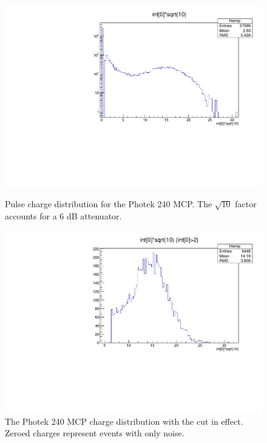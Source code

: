 \documentclass[12pt]{article}
\begin{document}
\begin{figure}[h]
\centering
\begin{minipage}[t]{.49\textwidth}
	\centering
	\includegraphics[width=\textwidth]{ChargeCut0.pdf}
	\caption{Pulse charge distribution for the Photek 240 MCP. 
		The $\sqrt{10}$ factor accounts for a 6 dB attenuator.}
	\label{fig:ChargeCut0}
\end{minipage} \hfill
\begin{minipage}[t]{.49\textwidth}
	\centering
	\includegraphics[width=\textwidth]{ChargeCut1.pdf}
	\caption{The Photek 240 MCP charge distribution with the cut in effect. 
		Zeroed charges represent events with only noise.}
	\label{fig:ChargeCut1}
\end{minipage}
\end{figure}
\end{document}
